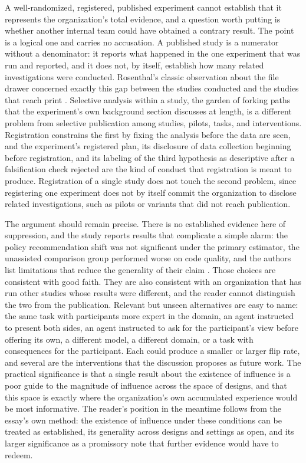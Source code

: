\documentclass[11pt]{article}
\begin{document}
A well-randomized, registered, published experiment cannot establish that it represents the organization's total evidence, and a question worth putting is whether another internal team could have obtained a contrary result. The point is a logical one and carries no accusation. A published study is a numerator without a denominator: it reports what happened in the one experiment that was run and reported, and it does not, by itself, establish how many related investigations were conducted. Rosenthal's classic observation about the file drawer concerned exactly this gap between the studies conducted and the studies that reach print \cite{rosenthal}. Selective analysis within a study, the garden of forking paths that the experiment's own background section discusses at length, is a different problem from selective publication among studies, pilots, tasks, and interventions. Registration constrains the first by fixing the analysis before the data are seen, and the experiment's registered plan, its disclosure of data collection beginning before registration, and its labeling of the third hypothesis as descriptive after a falsification check rejected are the kind of conduct that registration is meant to produce. Registration of a single study does not touch the second problem, since registering one experiment does not by itself commit the organization to disclose related investigations, such as pilots or variants that did not reach publication.

The argument should remain precise. There is no established evidence here of suppression, and the study reports results that complicate a simple alarm: the policy recommendation shift was not significant under the primary estimator, the unassisted comparison group performed worse on code quality, and the authors list limitations that reduce the generality of their claim \cite{herdagdelen}. Those choices are consistent with good faith. They are also consistent with an organization that has run other studies whose results were different, and the reader cannot distinguish the two from the publication. Relevant but unseen alternatives are easy to name: the same task with participants more expert in the domain, an agent instructed to present both sides, an agent instructed to ask for the participant's view before offering its own, a different model, a different domain, or a task with consequences for the participant. Each could produce a smaller or larger flip rate, and several are the interventions that the discussion proposes as future work. The practical significance is that a single result about the existence of influence is a poor guide to the magnitude of influence across the space of designs, and that this space is exactly where the organization's own accumulated experience would be most informative. The reader's position in the meantime follows from the essay's own method: the existence of influence under these conditions can be treated as established, its generality across designs and settings as open, and its larger significance as a promissory note that further evidence would have to redeem.
\end{document}
